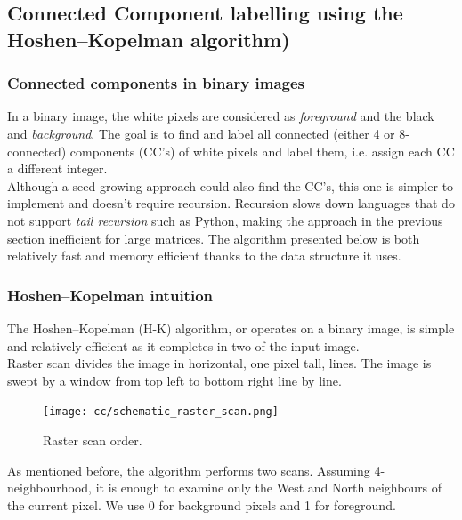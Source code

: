 \documentclass[a4paper]{article}
\begin{document}
\subsection{Connected Component labelling using the Hoshen–Kopelman algorithm)}

\subsubsection{Connected components in binary images}
In a binary image, the white pixels are considered as \textit{foreground} and the black and \textit{background}. The goal is to find and label all connected (either 4 or 8-connected) components (CC's) of white pixels and label them, i.e. assign each CC a different integer.\\
Although a seed growing approach could also find the CC's, this one is simpler to implement and doesn't require recursion. Recursion slows down languages that do not support \textit{tail recursion} such as Python, making the approach in the previous section inefficient for large matrices. The algorithm presented below is both relatively fast and memory efficient thanks to the data structure it uses.

\subsubsection{Hoshen–Kopelman intuition}

The Hoshen–Kopelman (H-K) algorithm, or  operates on a binary image, is simple and relatively efficient as it completes in two  of the input image. \\
Raster scan divides the image in horizontal, one pixel tall, lines. The image is swept by a window from top left to bottom right line by line.\\
\begin{figure}[H]
    \centering
    \texttt{[image: cc/schematic\_raster\_scan.png]}
    \caption{Raster scan order.}
\end{figure}
As mentioned before, the algorithm performs two scans. Assuming 4-neighbourhood, it is enough to examine only the West and North neighbours of the current pixel. We use 0 for background pixels and 1 for foreground. 
\end{document}
